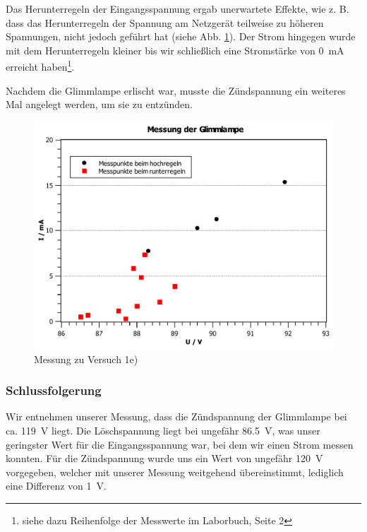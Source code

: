 \documentclass[11pt,a4paper,titlepage, ngerman]{article}
\begin{document}
				Das Herunterregeln der Eingangsspannung ergab unerwartete Effekte, wie z. B. dass das Herunterregeln der Spannung am Netzgerät teilweise zu höheren Spannungen, nicht jedoch  geführt hat (siehe Abb. \ref{KL e}).
				Der Strom hingegen wurde mit dem Herunterregeln kleiner bis wir schließlich eine Stromstärke von \SI{0}{mA} erreicht haben\footnote{siehe dazu Reihenfolge der Messwerte im Laborbuch, Seite 2}.
				
				Nachdem die Glimmlampe erlischt war, musste die Zündspannung ein weiteres Mal angelegt werden, um sie zu entzünden.
			
				\begin{figure}
					\centering
					\includegraphics[width=\textwidth]{KennlinieGlimmlampe.pdf}
					\caption{Messung zu Versuch 1e)}
					\label{KL e}
				\end{figure}
			
			\subsubsection*{Schlussfolgerung}
			
				Wir entnehmen unserer Messung, dass die Zündspannung der Glimmlampe bei ca. \SI{119}{\V} liegt.
				Die Löschspannung liegt bei ungefähr \SI{86,5}{\V}, was unser geringster Wert für die Eingangsspannung war, bei dem wir einen Strom messen konnten.
				Für die Zündspannung wurde uns ein Wert von ungefähr \SI{120}{\V} vorgegeben, welcher mit unserer Messung weitgehend übereinstimmt, lediglich eine Differenz von \SI{1}{\V}.
				
\end{document}

